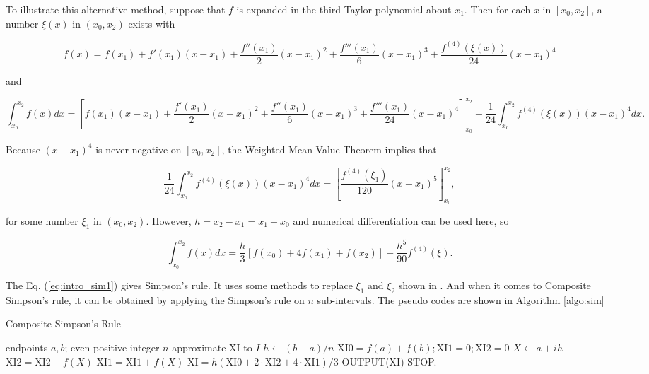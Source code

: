 \documentclass[preprint,12pt]{elsarticle}
\begin{document}
To illustrate this alternative method, suppose that $f$ is expanded in the third Taylor polynomial about $x_1$. Then for each $x$ in $[x_0,x_2]$, a number $\xi(x)$ in $(x_0,x_2)$ exists with

\begin{dmath}
    f(x)=f(x_1)+f'(x_1)(x-x_1)+\frac{f''(x_1)}{2}(x-x_1)^2 +\frac{f'''(x_1)}{6}(x-x_1)^3 +\frac{f^{(4)}(\xi(x))}{24}(x-x_1)^4
\end{dmath}

and

\begin{dmath}
    \int_{x_0}^{x_2}f(x)dx=\left[f(x_1)(x-x_1)+\frac{f'(x_1)}{2}(x-x_1)^2+\frac{f''(x_1)}{6}(x-x_1)^3+\frac{f'''(x_1)}{24}(x-x_1)^4\right]^{x_2}_{x_0}+\frac{1}{24}\int_{x_0}^{x_2}f^{(4)}(\xi(x))(x-x_1)^{4}dx.
\end{dmath}

Because $(x-x_1)^4$ is never negative on $[x_0,x_2]$, the Weighted Mean Value Theorem implies that

\begin{equation}
    \frac{1}{24}\int_{x_0}^{x_2}f^{(4)}(\xi(x))(x-x_1)^{4}dx=\left[\frac{f^{(4)}(\xi_1)}{120}(x-x_1)^5 \right]^{x_2}_{x_0},
\end{equation}

for some number $\xi_1$ in $(x_0,x_2)$. However, $h=x_2 -x_1 =x_1 -x_0$ and numerical differentiation can be used here, so

\begin{equation}
\label{eq:intro_sim1}
    \int_{x_0}^{x_2}f(x)dx =\frac{h}{3}[f(x_0)+4f(x_1)+f(x_2)]-\frac{h^5}{90}f^{(4)}(\xi).
\end{equation}

The Eq. (\ref{eq:intro_sim1}) gives Simpson’s rule. It uses some methods to replace $\xi_1$ and $\xi_2$ shown in \cite{burden:2001na}. And when it comes to Composite Simpson's rule, it can be obtained by applying the Simpson's rule on $n$ sub-intervals. The pseudo codes are shown in Algorithm \ref{algo:sim}

\begin{algorithm}
    \caption{Composite Simpson's Rule}
    \label{algo:sim}
    \begin{algorithmic}[1]
    \Require endpoints $a,b$; even positive integer $n$
    \Ensure approximate XI to $I$
    \State $h\gets (b-a)/n$
    \State $\mathrm{XI}0=f(a)+f(b);\mathrm{XI}1=0;\mathrm{XI}2=0$
        \State $X\gets a+ih$
            \State $\mathrm{XI}2=\mathrm{XI}2+f(X)$
        \Else
            \State $\mathrm{XI}1=\mathrm{XI}1+f(X)$
        \EndIf
    \EndFor
    \State $\mathrm{XI}=h(\mathrm{XI}0+2\cdot \mathrm{XI}2+4\cdot \mathrm{XI}1)/3$
    \State OUTPUT(XI)
    \State STOP.
    \end{algorithmic}
\end{algorithm}
\end{document}
